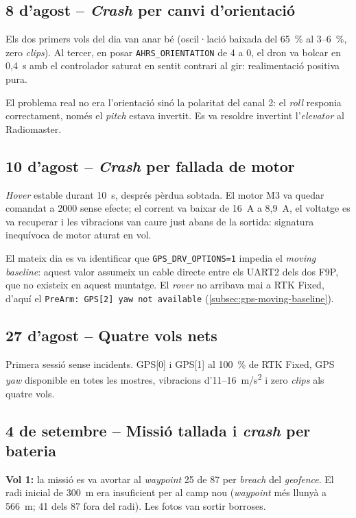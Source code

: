 \subsection{8 d'agost -- \emph{Crash} per canvi d'orientació}

Els dos primers vols del dia van anar bé (oscil·lació baixada del 65~\% al 3--6~\%, zero \emph{clips}). Al tercer, en posar \texttt{AHRS\_ORIENTATION} de 4 a 0, el dron va bolcar en 0,4~s amb el controlador saturat en sentit contrari al gir: realimentació positiva pura.

El problema real no era l'orientació sinó la polaritat del canal 2: el \emph{roll} responia correctament, només el \emph{pitch} estava invertit. Es va resoldre invertint l'\emph{elevator} al Radiomaster.

\subsection{10 d'agost -- \emph{Crash} per fallada de motor}

\emph{Hover} estable durant 10~s, després pèrdua sobtada. El motor M3 va quedar comandat a 2000 sense efecte; el corrent va baixar de 16~A a 8,9~A, el voltatge es va recuperar i les vibracions van caure just abans de la sortida: signatura inequívoca de motor aturat en vol.

El mateix dia es va identificar que \texttt{GPS\_DRV\_OPTIONS=1} impedia el \emph{moving baseline}: aquest valor assumeix un cable directe entre els UART2 dels dos F9P, que no existeix en aquest muntatge. El \emph{rover} no arribava mai a RTK Fixed, d'aquí el \texttt{PreArm: GPS[2] yaw not available} (\cref{subsec:gps-moving-baseline}).

\subsection{27 d'agost -- Quatre vols nets}

Primera sessió sense incidents. GPS[0] i GPS[1] al 100~\% de RTK Fixed, GPS \emph{yaw} disponible en totes les mostres, vibracions d'11--16~m/s\textsuperscript{2} i zero \emph{clips} als quatre vols.

\subsection{4 de setembre -- Missió tallada i \emph{crash} per bateria}

\textbf{Vol 1:} la missió es va avortar al \emph{waypoint} 25 de 87 per \emph{breach} del \emph{geofence}. El radi inicial de 300~m era insuficient per al camp nou (\emph{waypoint} més llunyà a 566~m; 41 dels 87 fora del radi). Les fotos van sortir borroses.

